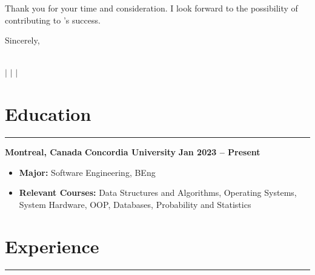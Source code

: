 \documentclass[10pt]{article}
\begin{document}
\vspace{1.5em}
Thank you for your time and consideration. I look forward to the possibility of contributing to \company's success.

\vspace{2em}
Sincerely, \\
\fullname

\newpage


\begin{center}
    {\Huge \textbf{\fullname}} \\
    \vspace{1mm}
    {\small 
    \faPhone \hspace{0mm} \href{tel:+15149445977}{\phone} $\vert$ 
    \faEnvelope \hspace{0mm} \href{mailto:massimo02caruso@gmail.com}{\email} $\vert$ 
    \faLinkedin \hspace{0mm} \href{https://linkedin.com/in/massimocaruso}{\linkedin} $\vert$ 
    \faGithub \hspace{0mm} \href{https://github.com/Extinctable}{\github}
    }
\end{center}

\vspace{-8mm}

\section*{Education}
\vspace{-2mm}
\hrule
\vspace{0mm}

\textbf{Montreal, Canada} \hfill \textbf{Concordia University} \hfill \textbf{Jan 2023 -- Present} 
\vspace{-4mm}
\begin{itemize}[left=0.15in, itemsep=0pt]
    \item \textbf{Major:} Software Engineering, BEng
    \item \textbf{Relevant Courses:} Data Structures and Algorithms, Operating Systems, System Hardware, OOP, Databases, Probability and Statistics
\end{itemize}

\section*{Experience}
\vspace{-2mm}
\hrule
\vspace{0mm}
\end{document}
